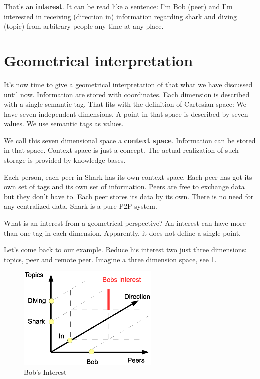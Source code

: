 That's an {\bf interest}. It can be read like a sentence: I'm Bob (peer) and I'm interested in receiving (direction in) information regarding shark and diving (topic) from arbitrary people any time at any place.

\section{Geometrical interpretation}
It's now time to give a geometrical interpretation of that what we have discussed until now. Information are stored with coordinates. Each dimension is described with a single semantic tag. That fits with the definition of Cartesian space: We have seven independent dimensions. A point in that space is described by seven values. We use semantic tags as values.

We call this seven dimensional space a {\bf context space}. Information can be stored in that space. Context space is just a concept. The actual realization of such storage is provided by knowledge bases.

Each person, each peer in Shark has its own context space. Each peer has got its own set of tags and its own set of information. Peers are free to exchange data but they don't have to. Each peer stores its data by its own. There is no need for any centralized data. Shark is a pure P2P system.

What is an interest from a geometrical perspective? An interest can have more than one tag in each dimension. Apparently, it does not define a single point.

Let's come back to our example. Reduce his interest two just three dimensions: topics, peer and remote peer. Imagine a three dimension space,
see \ref{fig:contextspace}.

\begin{figure}[t]
\centering
\includegraphics[width=0.60\textwidth]{bobsInterest.eps}
\caption{Bob's Interest}
\label{fig:contextspace}
\end{figure}

